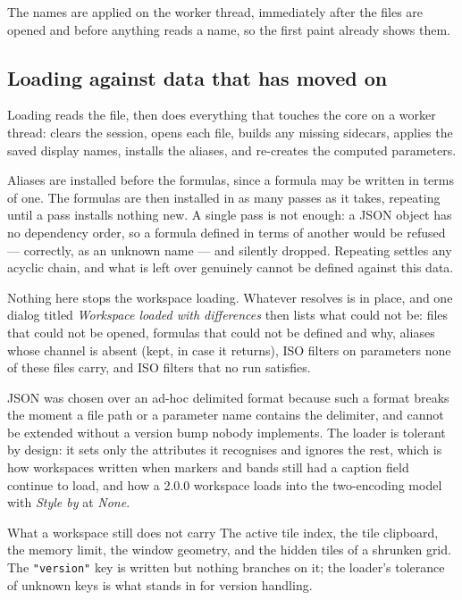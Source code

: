\documentclass[11pt,a4paper,oneside]{report}
\newcommand{\code}[1]{\texttt{#1}}
\begin{document}
The names are applied on the worker thread, immediately after the files are
opened and before anything reads a name, so the first paint already shows them.

\subsection{Loading against data that has moved on}

Loading reads the file, then does everything that touches the core on a worker
thread: clears the session, opens each file, builds any missing sidecars, applies
the saved display names, installs the aliases, and re-creates the computed
parameters.

Aliases are installed before the formulas, since a formula may be written in
terms of one. The formulas are then installed in as many passes as it takes,
repeating until a pass installs nothing new. A single pass is not enough: a JSON
object has no dependency order, so a formula defined in terms of another would be
refused --- correctly, as an unknown name --- and silently dropped. Repeating
settles any acyclic chain, and what is left over genuinely cannot be defined
against this data.

Nothing here stops the workspace loading. Whatever resolves is in place, and one
dialog titled \emph{Workspace loaded with differences} then lists what could not
be: files that could not be opened, formulas that could not be defined and why,
aliases whose channel is absent (kept, in case it returns), ISO filters on
parameters none of these files carry, and ISO filters that no run satisfies.

JSON was chosen over an ad-hoc delimited format because such a format breaks the
moment a file path or a parameter name contains the delimiter, and cannot be
extended without a version bump nobody implements. The loader is tolerant by
design: it sets only the attributes it recognises and ignores the rest, which is
how workspaces written when markers and bands still had a caption field continue
to load, and how a 2.0.0 workspace loads into the two-encoding model with
\emph{Style by} at \emph{None}.

\begin{aoenote}{What a workspace still does not carry}
The active tile index, the tile clipboard, the memory limit, the window geometry,
and the hidden tiles of a shrunken grid. The \code{"version"} key is written but
nothing branches on it; the loader's tolerance of unknown keys is what stands in
for version handling.
\end{aoenote}
\end{document}
